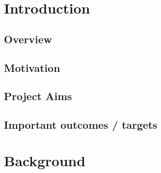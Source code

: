 \documentclass[12pt, conference, final, a4paper, onecolumn, compsoc]{IEEEtran}
\begin{document}
    \tableofcontents


    \section{Introduction}
    \subsection*{Overview}
    \paragraph{}

    \subsection*{Motivation} %
    \paragraph{}

    \subsection*{Project Aims}
    \paragraph{}

    \subsection*{Important outcomes / targets}
    \paragraph{}


    \section{Background}

\end{document}
